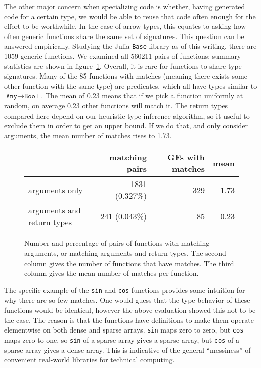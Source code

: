
The other major concern when specializing code is whether, having generated code
for a certain type, we would be able to reuse that code often enough for the
effort to be worthwhile.
In the case of arrow types, this equates to asking how often generic functions
share the same set of signatures.
This question can be answered empirically.
Studying the Julia \texttt{Base} library as of this writing, there are 1059
generic functions. We examined all 560211 pairs of functions; summary
statistics are shown in figure~\ref{fig:matchingfuncs}.
Overall, it is rare for functions to share type signatures.
Many of the 85 functions with matches (meaning there exists some other function
with the same type) are predicates, which all have types similar to
$\texttt{Any}\rightarrow \texttt{Bool}$. The mean of 0.23 means that if we
pick a function uniformly at random, on average 0.23 other functions will
match it.
The return types compared here depend on our heuristic type inference algorithm,
so it useful to exclude them in order to get an upper bound.
If we do that, and only consider arguments, the mean number of matches rises to 1.73.

\begin{figure}
  \begin{center}
    \begin{tabular}{|l|r|r|r|}\hline
    &  \textbf{matching pairs} & \textbf{GFs with matches} & \textbf{mean} \\
      \hline \hline
arguments only             & 1831 (0.327\%)  &   329       &          1.73 \\
\hline
arguments and return types &  241 (0.043\%)  &   85        &          0.23 \\
\hline
\end{tabular}
\end{center}
  \caption{
    Number and percentage of pairs of functions with matching arguments, or
    matching arguments and return types. The second column gives the number of
    functions that have matches. The third column gives the
    mean number of matches per function.
  }
  \label{fig:matchingfuncs}
\end{figure}

The specific example of the \texttt{sin} and \texttt{cos} functions provides
some intuition for why there are so few matches.
One would guess that the type behavior of these functions would be identical,
however the above evaluation showed this not to be the case.
The reason is that the functions have definitions to make them operate
elementwise on both dense and sparse arrays.
\texttt{sin} maps zero to zero, but \texttt{cos} maps zero to one,
so \texttt{sin} of a sparse array gives a sparse array, but
\texttt{cos} of a sparse array gives a dense array.
This is indicative of the general ``messiness'' of convenient real-world
libraries for technical computing.


